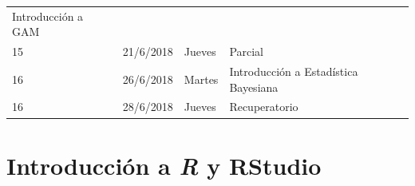 \documentclass[]{book}
\theoremstyle{definition}
\theoremstyle{definition}
\theoremstyle{definition}
\theoremstyle{remark}
\begin{document}
\begin{longtable}[]{@{}llll@{}}
\begin{minipage}[t]{0.71\columnwidth}
Introducción a GAM\strut
\end{minipage}\tabularnewline
\begin{minipage}[t]{0.05\columnwidth}\raggedright
15\strut
\end{minipage} & \begin{minipage}[t]{0.07\columnwidth}\raggedright
21/6/2018\strut
\end{minipage} & \begin{minipage}[t]{0.05\columnwidth}\raggedright
Jueves\strut
\end{minipage} & \begin{minipage}[t]{0.71\columnwidth}\raggedright
Parcial\strut
\end{minipage}\tabularnewline
\begin{minipage}[t]{0.05\columnwidth}\raggedright
16\strut
\end{minipage} & \begin{minipage}[t]{0.07\columnwidth}\raggedright
26/6/2018\strut
\end{minipage} & \begin{minipage}[t]{0.05\columnwidth}\raggedright
Martes\strut
\end{minipage} & \begin{minipage}[t]{0.71\columnwidth}\raggedright
Introducción a Estadística Bayesiana\strut
\end{minipage}\tabularnewline
\begin{minipage}[t]{0.05\columnwidth}\raggedright
16\strut
\end{minipage} & \begin{minipage}[t]{0.07\columnwidth}\raggedright
28/6/2018\strut
\end{minipage} & \begin{minipage}[t]{0.05\columnwidth}\raggedright
Jueves\strut
\end{minipage} & \begin{minipage}[t]{0.71\columnwidth}\raggedright
Recuperatorio\strut
\end{minipage}\tabularnewline
\bottomrule
\end{longtable}

\hypertarget{introduccion-a-r-y-rstudio}{%
\chapter{\texorpdfstring{Introducción a \emph{R} y
RStudio}{Introducción a R y RStudio}}\label{introduccion-a-r-y-rstudio}}
\end{document}
